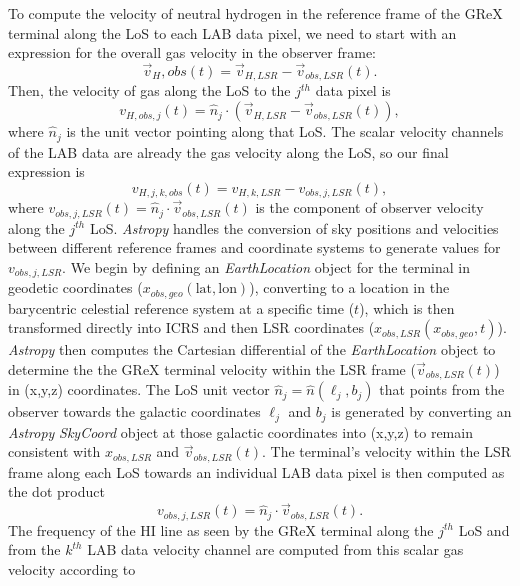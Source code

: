 To compute the velocity of neutral hydrogen in the reference frame of the GReX terminal along the LoS to each LAB data pixel, we need to start with an expression for the overall gas velocity in the observer frame:
\begin{equation*}
    \vec{v}_H,obs(t) = \vec{v}_{H, LSR} - \vec{v}_{obs, LSR}(t).
\end{equation*}
Then, the velocity of gas along the LoS to the $j^{th}$ data pixel is
\begin{equation*}
    v_{H,obs,j}(t) = \hat{n}_j \cdot (\vec{v}_{H, LSR} - \vec{v}_{obs, LSR}(t)),
\end{equation*}
where $\hat{n}_j$ is the unit vector pointing along that LoS.
The scalar velocity channels of the LAB data are already the gas velocity along the LoS, so our final expression is
\begin{equation*}
    v_{H,j,k,obs}(t) = v_{H,k,LSR} - v_{obs,j,LSR}(t),
\end{equation*}
where $v_{obs,j,LSR}(t)=\hat{n}_j\cdot\vec{v}_{obs, LSR}(t)$ is the component of observer velocity along the $j^{th}$ LoS.
\textit{Astropy} handles the conversion of sky positions and velocities between different reference frames and coordinate systems to generate values for $v_{obs,j,LSR}$. 
We begin by defining an \textit{EarthLocation} object for the terminal in geodetic coordinates ($x_{obs,geo}(\text{lat},\text{lon})$), converting to a location in the barycentric celestial reference system at a specific time ($t$), which is then transformed directly into ICRS and then LSR coordinates ($x_{obs,LSR}(x_{obs,geo},t)$). 
\textit{Astropy} then computes the Cartesian differential of the \textit{EarthLocation} object to determine the the GReX terminal velocity within the LSR frame ($\vec{v}_{obs,LSR}(t)$) in (x,y,z) coordinates. 
The LoS unit vector $\hat{n}_j=\hat{n}(\ell_j,b_j)$ that points from the observer towards the galactic coordinates $\ell_j$ and $b_j$ is generated by converting an \textit{Astropy} \textit{SkyCoord} object at those galactic coordinates into (x,y,z) to remain consistent with $x_{obs,LSR}$ and $\vec{v}_{obs,LSR}(t)$. 
The terminal's velocity within the LSR frame along each LoS towards an individual LAB data pixel is then computed as the dot product
\begin{equation*}
    v_{obs,j,LSR}(t) =  \hat{n}_j\cdot\vec{v}_{obs,LSR}(t).
\end{equation*}
The frequency of the HI line as seen by the GReX terminal along the $j^{th}$ LoS and from the $k^{th}$ LAB data velocity channel are computed from this scalar gas velocity according to
